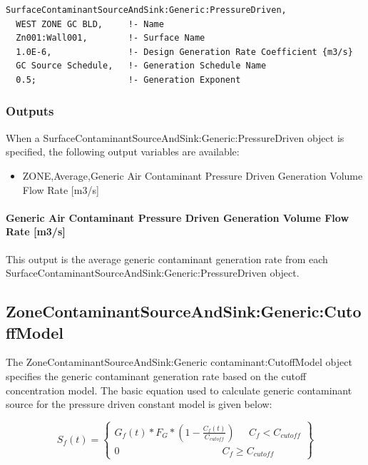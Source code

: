 \begin{lstlisting}
SurfaceContaminantSourceAndSink:Generic:PressureDriven,
  WEST ZONE GC BLD,     !- Name
  Zn001:Wall001,        !- Surface Name
  1.0E-6,               !- Design Generation Rate Coefficient {m3/s}
  GC Source Schedule,   !- Generation Schedule Name
  0.5;                  !- Generation Exponent
\end{lstlisting}

\subsubsection{Outputs}\label{outputs-8-003}

When a Surface\-Contaminant\-Source\-And\-Sink:\-Generic:\-Pressure\-Driven object is specified, the following output variables are available:

\begin{itemize}
  \tightlist
  \item
    ZONE,Average,Generic Air Contaminant Pressure Driven Generation Volume Flow Rate {[}m3/s{]}
\end{itemize}

\paragraph{Generic Air Contaminant Pressure Driven Generation Volume Flow Rate {[}m3/s{]}}\label{generic-air-contaminant-pressure-driven-generation-volume-flow-rate-m3s}

This output is the average generic contaminant generation rate from each Surface\-Contaminant\-Source\-And\-Sink:\-Generic:\-Pressure\-Driven object.

\subsection{ZoneContaminantSourceAndSink:Generic:CutoffModel}\label{zonecontaminantsourceandsinkgenericcutoffmodel}

The Zone\-Contaminant\-Source\-And\-Sink:\-Generic contaminant:CutoffModel object specifies the generic contaminant generation rate based on the cutoff concentration model. The basic equation used to calculate generic contaminant source for the pressure driven constant model is given below:

\begin{equation}
{S_f}(t) = \left\{ \begin{array}{l}{G_f}(t)*{F_G}*\left( {1 - \frac{{{C_f}(t)}}{{{C_{cutoff}}}}} \right)\;\;\;\;\;{C_f} < {C_{cutoff}}\\0\;\;\;\;\;\;\;\;\;\;\;\;\;\;\;\;\;\;\;\;\;\;\;\;\;\;\;\;\;\;\;\;\;\;\;\;\;{C_f} \ge {C_{cutoff}}\end{array} \right\}
\end{equation}

